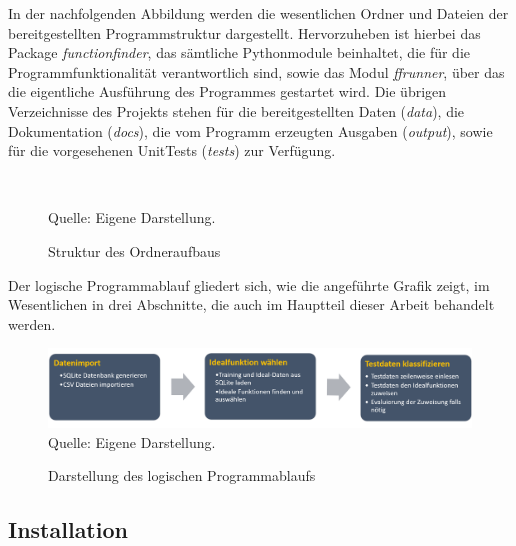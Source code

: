 In der nachfolgenden Abbildung werden die wesentlichen Ordner und Dateien der bereitgestellten Programmstruktur dargestellt. Hervorzuheben ist hierbei das Package \emph{functionfinder}, das sämtliche Pythonmodule beinhaltet, die für die Programmfunktionalität verantwortlich sind, sowie das Modul \emph{ffrunner}, über das die eigentliche Ausführung des Programmes gestartet wird.
Die übrigen Verzeichnisse des Projekts stehen für die bereitgestellten Daten (\emph{data}), die Dokumentation (\emph{docs}), die vom Programm erzeugten Ausgaben (\emph{output}), sowie für die vorgesehenen UnitTests (\emph{tests}) zur Verfügung.


\begin{figure}[h]
\caption{Struktur des Ordneraufbaus}
\begin{tabular}{c}  %

\end{tabular}\\
\centering
Quelle: Eigene Darstellung.
\label{fig:structure}
\end{figure}

Der logische Programmablauf gliedert sich, wie die angeführte Grafik zeigt, im Wesentlichen in drei Abschnitte, die auch im Hauptteil dieser Arbeit behandelt werden.

\begin{figure}[h]
\centering
\caption{Darstellung des logischen Programmablaufs}
\includegraphics[width=15cm]{pics/Flow.png}\\
Quelle: Eigene Darstellung.
\label{fig:flow}
\end{figure}


\FloatBarrier

\subsection{Installation}
\label{sub:installation}

